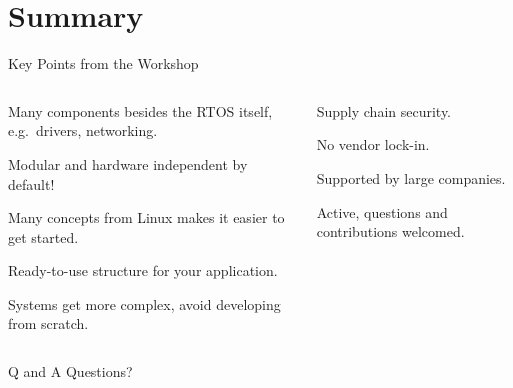 \documentclass[10pt, aspectratio=169]{beamer}
\begin{document}
\section*{Summary}
\begin{frame}[fragile]{Key Points from the Workshop}
  \begin{columns}
    \begin{column}{0.6\textwidth}
      \begin{description}
        \item [Ecosystem] Many components besides the RTOS itself, e.g.~drivers, networking.
        \item Modular and hardware independent by default!
        \item Many concepts from Linux makes it easier to get started.
        \item [Structure] Ready-to-use structure for your application.
        \item Systems get more complex, avoid developing from scratch.
      \end{description}
    \end{column}
    \begin{column}{0.4\textwidth}
      \begin{description}
        \item [Open Source] Supply chain security.
        \item No vendor lock-in.
        \item Supported by large companies.
        \item [Community] Active, questions and contributions welcomed.
      \end{description}
    \end{column}
  \end{columns}
\end{frame}
\begin{frame}{Q and A}
  \centering
  \LARGE Questions?

\end{frame}
\appendix
\end{document}

